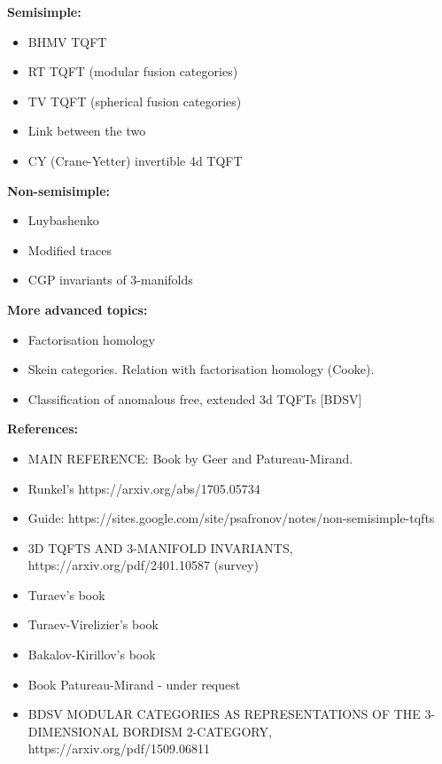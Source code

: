 \documentclass{article}
\begin{document}
\newpage


\textbf{Semisimple:}

\begin{itemize}
\item BHMV TQFT
\item RT TQFT (modular fusion categories)
\item TV TQFT (spherical fusion categories)
\item Link between the two 
\item CY (Crane-Yetter) invertible 4d TQFT
\end{itemize}




\textbf{Non-semisimple:}


\begin{itemize}
\item Luybashenko
\item  Modified traces
\item CGP invariants of 3-manifolds
\end{itemize}




\textbf{More advanced topics:}


\begin{itemize}
\item Factorisation homology
\item Skein categories. Relation with factorisation homology (Cooke).
\item Classification of anomalous free, extended 3d TQFTs [BDSV]
\end{itemize}


\textbf{References:}


\begin{itemize}
\item MAIN REFERENCE: Book by Geer and Patureau-Mirand.
\item Runkel's https://arxiv.org/abs/1705.05734
\item Guide: https://sites.google.com/site/psafronov/notes/non-semisimple-tqfts
\item  3D TQFTS AND 3-MANIFOLD INVARIANTS, https://arxiv.org/pdf/2401.10587 (survey)
\item Turaev's book
\item Turaev-Virelizier's book
\item Bakalov-Kirillov's book
\item Book Patureau-Mirand - under request
\item BDSV MODULAR CATEGORIES AS REPRESENTATIONS OF THE 3-DIMENSIONAL BORDISM 2-CATEGORY, https://arxiv.org/pdf/1509.06811
\end{itemize}







\end{document}
